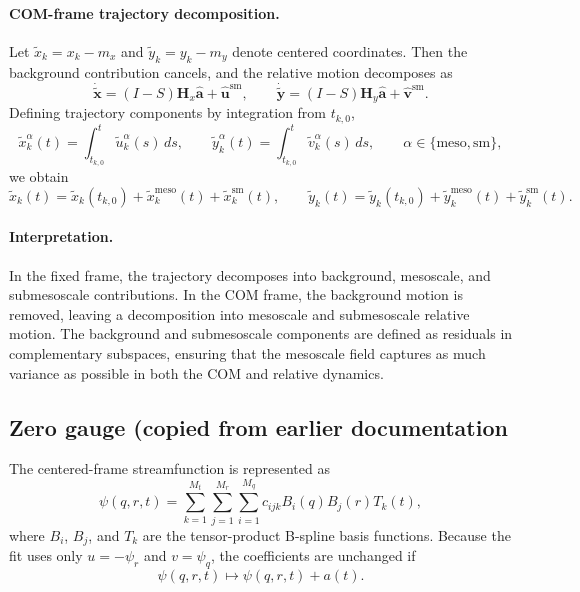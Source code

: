 \documentclass{article}
\begin{document}
\paragraph{COM-frame trajectory decomposition.}
Let $\tilde{x}_k = x_k - m_x$ and $\tilde{y}_k = y_k - m_y$ denote
centered coordinates. Then the background contribution cancels, and the
relative motion decomposes as
\begin{equation}
\dot{\tilde{\mathbf{x}}}
=
(I-S)\mathbf{H}_x \hat{\mathbf a}
+
\hat{\mathbf{u}}^{\mathrm{sm}},
\qquad
\dot{\tilde{\mathbf{y}}}
=
(I-S)\mathbf{H}_y \hat{\mathbf a}
+
\hat{\mathbf{v}}^{\mathrm{sm}}.
\end{equation}
Defining trajectory components by integration from $t_{k,0}$,
\begin{equation}
\tilde{x}_k^{\alpha}(t)
=
\int_{t_{k,0}}^{t} \tilde{u}_k^{\alpha}(s)\,ds,
\qquad
\tilde{y}_k^{\alpha}(t)
=
\int_{t_{k,0}}^{t} \tilde{v}_k^{\alpha}(s)\,ds,
\qquad
\alpha \in \{\mathrm{meso},\mathrm{sm}\},
\end{equation}
we obtain
\begin{equation}
\tilde{x}_k(t)
=
\tilde{x}_k(t_{k,0})
+
\tilde{x}_k^{\mathrm{meso}}(t)
+
\tilde{x}_k^{\mathrm{sm}}(t),
\qquad
\tilde{y}_k(t)
=
\tilde{y}_k(t_{k,0})
+
\tilde{y}_k^{\mathrm{meso}}(t)
+
\tilde{y}_k^{\mathrm{sm}}(t).
\end{equation}

\paragraph{Interpretation.}
In the fixed frame, the trajectory decomposes into background,
mesoscale, and submesoscale contributions. In the COM frame, the
background motion is removed, leaving a decomposition into mesoscale and
submesoscale relative motion. The background and submesoscale components
are defined as residuals in complementary subspaces, ensuring that the
mesoscale field captures as much variance as possible in both the COM
and relative dynamics.

\subsection{Zero gauge (copied from earlier documentation}

 The centered-frame streamfunction is represented as
 \[
 \psi(q,r,t) = \sum_{k=1}^{M_t} \sum_{j=1}^{M_r} \sum_{i=1}^{M_q}
 c_{ijk} B_i(q) B_j(r) T_k(t),
 \]
 where $B_i$, $B_j$, and $T_k$ are the tensor-product B-spline
 basis functions. Because the fit uses only $u = -\psi_r$ and
 $v = \psi_q$, the coefficients are unchanged if
 \[
 \psi(q,r,t) \mapsto \psi(q,r,t) + a(t).
 \]
\end{document}
